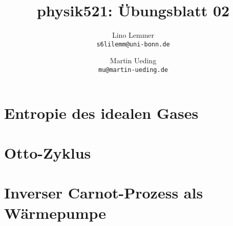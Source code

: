 

\setcounter{section}{1}
\renewcommand\thesection{H\,2.\arabic{section}}
\renewcommand\thesubsection{\thesection.\alph{subsection}}

\title{physik521: Übungsblatt 02}
\author{Lino Lemmer \\ \small{\texttt{s6lilemm@uni-bonn.de}} \and Martin Ueding \\ \small{\texttt{mu@martin-ueding.de}}}


\maketitle
\section{Entropie des idealen Gases}

\subsection{}

\subsection{}

\subsection{}

\section{Otto-Zyklus}

\section{Inverser Carnot-Prozess als Wärmepumpe}

\subsection{}

\subsection{}


